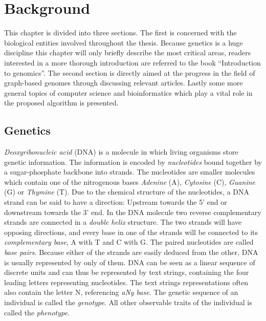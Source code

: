 \documentclass[thesis.tex]{subfiles}
\begin{document}
\chapter{Background}
This chapter is divided into three sections. The first is concerned with the biological entities involved throughout the thesis. Because genetics is a huge discipline this chapter will only briefly describe the most critical areas, readers interested in a more thorough introduction are referred to the book ``Introduction to genomics''\cite{introduction_to_genomics}. The second section is directly aimed at the progress in the field of graph-based genomes through discussing relevant articles. Lastly some more general topics of computer science and bioinformatics which play a vital role in the proposed algorithm is presented.
\section{Genetics}
\textit{Deoxyribonucleic acid} (DNA) is a molecule in which living organisms store genetic information. The information is encoded by \textit{nucleotides} bound together by a sugar-phosphate backbone into strands. The nucleotides are smaller molecules which contain one of the nitrogenous bases \textit{Adenine} (A), \textit{Cytosine} (C), \textit{Guanine} (G) or \textit{Thymine} (T). Due to the chemical structure of the nucleotides, a DNA strand can be said to have a direction: Upstream towards the 5' end or downstream towards the 3' end. In the DNA molecule two reverse complementary strands are connected in a \textit{double helix} structure. The two strands will have opposing directions, and every base in one of the strands will be connected to its \textit{complementary base}, A with T and C with G. The paired nucleotides are called \textit{base pairs}. Because either of the strands are easily deduced from the other, DNA is usually represented by only of them. DNA can be seen as a linear sequence of discrete units and can thus be represented by text strings, containing the four leading letters representing nucleotides. The text strings representations often also contain the letter N, referencing \textit{aNy base}. The genetic sequence of an individual is called the \textit{genotype}. All other observable traits of the individual is called the \textit{phenotype}.
\end{document}
